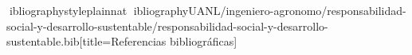 \documentclass[spanish,letterpaper,oneside]{article}
\begin{document}
\hypersetup{pageanchor=false}
\begingroup
\fontsize{14}{17}\selectfont
\renewcommand{\Huge}{\fontsize{14}{17}\selectfont\bfseries}
\renewcommand{\large}{\fontsize{14}{17}\selectfont}
\templatePortrait
\clearpage
\endgroup
\hypersetup{pageanchor=true}
\templatePagecfg
\singlespacing
\setlength{\tabcolsep}{8pt}
\renewcommand{\arraystretch}{1.18}

\newpage
ibliographystyle{plainnat}
ibliography{UANL/ingeniero-agronomo/responsabilidad-social-y-desarrollo-sustentable/responsabilidad-social-y-desarrollo-sustentable.bib}[title={Referencias bibliográficas}]
\end{document}

